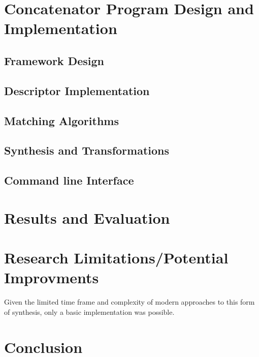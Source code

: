 \documentclass{scrartcl}
\begin{document}
    \section*{Concatenator Program Design and Implementation}
    \subsection*{Framework Design}
    \subsection*{Descriptor Implementation}
    \subsection*{Matching Algorithms}
    \subsection*{Synthesis and Transformations}
    \subsection*{Command line Interface}

    \section*{Results and Evaluation}

    \section*{Research Limitations/Potential Improvments}
    Given the limited time frame and complexity of modern approaches to this
    form of synthesis, only a basic implementation was possible.
    \section*{Conclusion}
\end{document}

